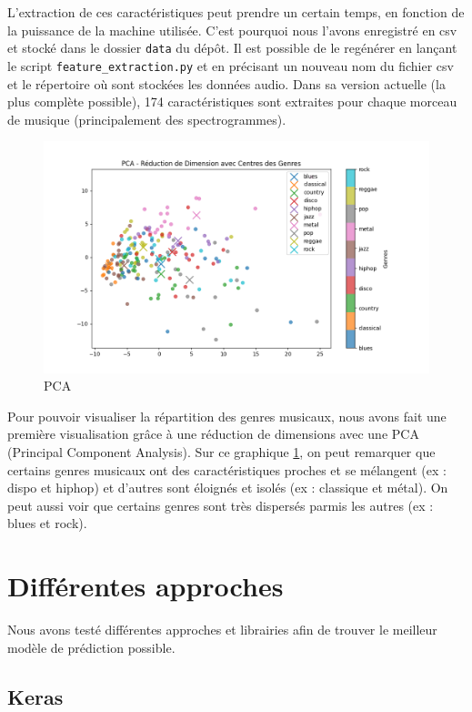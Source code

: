 \documentclass{article}
\begin{document}
L'extraction de ces caractéristiques peut prendre un certain temps, en fonction de la puissance de la machine utilisée. C'est pourquoi nous l'avons enregistré en csv et stocké dans le dossier \texttt{data} du dépôt. Il est possible de le regénérer en lançant le script \texttt{feature\_extraction.py} et en précisant un nouveau nom du fichier csv et le répertoire où sont stockées les données audio. Dans sa version actuelle (la plus complète possible), 174 caractéristiques sont extraites pour chaque morceau de musique (principalement des spectrogrammes).

\begin{figure}[h!]
    \centering
    \includegraphics[width=\textwidth]{img/pca_plot.png}
    \caption{PCA}
    \label{fig:pca}
\end{figure}

Pour pouvoir visualiser la répartition des genres musicaux, nous avons fait une première visualisation grâce à une réduction de dimensions avec une PCA (Principal Component Analysis). Sur ce graphique \ref{fig:pca}, on peut remarquer que certains genres musicaux ont des caractéristiques proches et se mélangent (ex : dispo et hiphop) et d'autres sont éloignés et isolés (ex : classique et métal). On peut aussi voir que certains genres sont très dispersés parmis les autres (ex : blues et rock).

\newpage
\section{Différentes approches}

Nous avons testé différentes approches et librairies afin de trouver le meilleur modèle de prédiction possible.

\subsection{Keras}
\end{document}
